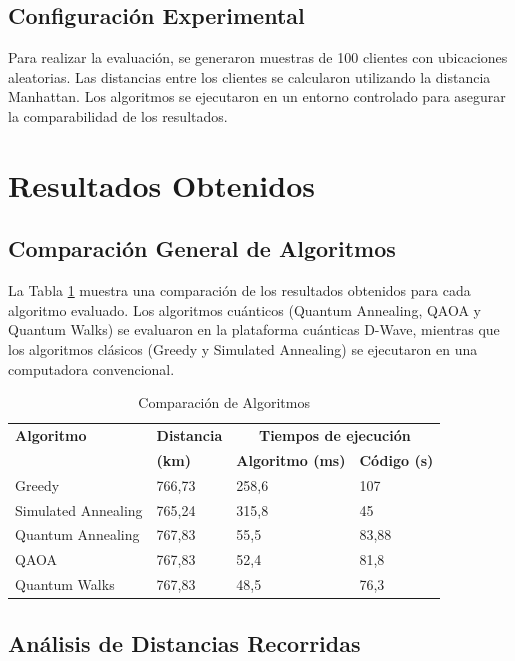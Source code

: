 \documentclass[11pt,a4paper,spanish]{book}
\begin{document}
\subsection{Configuración Experimental}

Para realizar la evaluación, se generaron muestras de 100 clientes con ubicaciones aleatorias. Las distancias entre los clientes se calcularon utilizando la distancia Manhattan. Los algoritmos se ejecutaron en un entorno controlado para asegurar la comparabilidad de los resultados.

\section{Resultados Obtenidos}

\subsection{Comparación General de Algoritmos}

La Tabla \ref{tab:comparison} muestra una comparación de los resultados obtenidos para cada algoritmo evaluado. Los algoritmos cuánticos (Quantum Annealing, QAOA y Quantum Walks) se evaluaron en la plataforma cuánticas D-Wave, mientras que los algoritmos clásicos (Greedy y Simulated Annealing) se ejecutaron en una computadora convencional.

\begin{table}[H]
\centering
\begin{tabular}{|m{5cm}|m{3cm}|m{3cm}|m{3cm}|}
\hline
\textbf{Algoritmo} & \textbf{Distancia} & \multicolumn{2}{c|}{\textbf{Tiempos de ejecución}} \\ \cline{3-4}
& \textbf{(km)} & \textbf{Algoritmo (ms)} & \textbf{Código (s)} \\ \hline
Greedy & 766,73 & 258,6 & 107 \\ \hline
Simulated Annealing & 765,24 & 315,8 & 45 \\ \hline
Quantum Annealing & 767,83 & 55,5 & 83,88 \\ \hline
QAOA & 767,83 & 52,4 & 81,8 \\ \hline
Quantum Walks & 767,83 & 48,5 & 76,3 \\ \hline
\end{tabular}
\caption{Comparación de Algoritmos}
\label{tab:comparison}
\end{table}

\subsection{Análisis de Distancias Recorridas}
\end{document}
